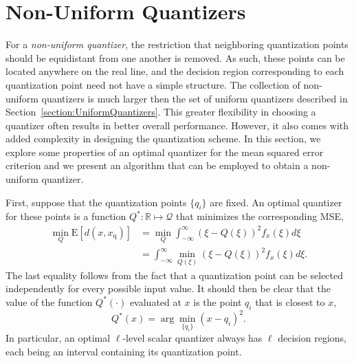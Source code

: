 \section{Non-Uniform Quantizers}
\label{section:NonUniformQuantizers}

For a \emph{non-uniform quantizer}, the restriction that neighboring quantization points should be equidistant from one another is removed.
As such, these points can be located anywhere on the real line, and the decision region corresponding to each quantization point need not have a simple structure.
The collection of non-uniform quantizers is much larger then the set of uniform quantizers described in Section~\ref{section:UniformQuantizers}.
This greater flexibility in choosing a quantizer often results in better overall performance.
However, it also comes with added complexity in designing the quantization scheme.
In this section, we explore some properties of an optimal quantizer for the mean squared error criterion and we present an algorithm that can be employed to obtain a non-uniform quantizer.

First, suppose that the quantization points $\{ q_i \}$ are fixed.
An optimal quantizer for these points is a function $Q^* : \mathbb{R} \mapsto \mathcal{Q}$ that minimizes the corresponding MSE,
\begin{equation*}
\begin{split}
\min_Q \mathrm{E} [ d(x, x_{\mathrm{q}}) ]
&= \min_Q \int_{-\infty}^{\infty} (\xi - Q(\xi))^2 f_x(\xi) d\xi \\
&= \int_{-\infty}^{\infty} \min_{Q(\xi)} (\xi - Q(\xi))^2 f_x(\xi) d\xi .
\end{split}
\end{equation*}
The last equality follows from the fact that a quantization point can be selected independently for every possible input value.
It should then be clear that the value of the function $Q^*(\cdot)$ evaluated at $x$ is the point $q_i$ that is closest to $x$,
\begin{equation*}
Q^*(x) = \arg \min_{\{ q_i \}} (x - q_i)^2 .
\end{equation*}
In particular, an optimal $\ell$-level scalar quantizer always has $\ell$ decision regions, each being an interval containing its quantization point.

